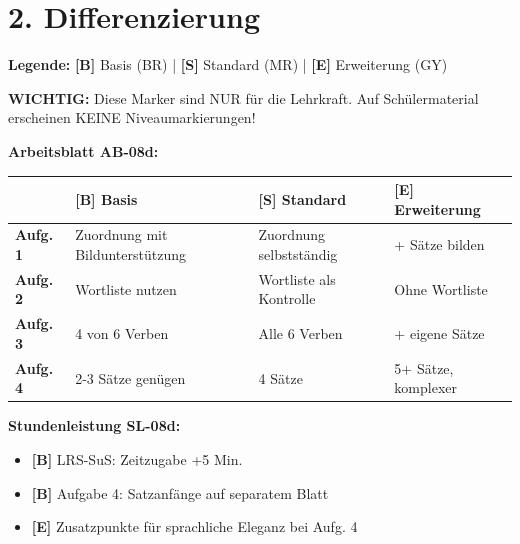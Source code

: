 \documentclass[11pt, a4paper]{article}
\newcommand{\B}{\textcolor{basis}{\textbf{[B]}}}
\newcommand{\Std}{\textcolor{standard}{\textbf{[S]}}}
\newcommand{\E}{\textcolor{erweiterung}{\textbf{[E]}}}
\begin{document}

\section*{2. Differenzierung}

\begin{differenzierung}
\textbf{Legende:} \B{} Basis (BR) | \Std{} Standard (MR) | \E{} Erweiterung (GY)

\vspace{0.5em}

\textbf{WICHTIG:} Diese Marker sind NUR für die Lehrkraft. Auf Schülermaterial erscheinen KEINE Niveaumarkierungen!
\end{differenzierung}

\vspace{1em}

\textbf{Arbeitsblatt AB-08d:}

\begin{tabularx}{\textwidth}{|l|X|X|X|}
\hline
& \B{} \textbf{Basis} & \Std{} \textbf{Standard} & \E{} \textbf{Erweiterung} \\
\hline
\textbf{Aufg. 1} & Zuordnung mit Bildunterstützung & Zuordnung selbstständig & + Sätze bilden \\
\hline
\textbf{Aufg. 2} & Wortliste nutzen & Wortliste als Kontrolle & Ohne Wortliste \\
\hline
\textbf{Aufg. 3} & 4 von 6 Verben & Alle 6 Verben & + eigene Sätze \\
\hline
\textbf{Aufg. 4} & 2-3 Sätze genügen & 4 Sätze & 5+ Sätze, komplexer \\
\hline
\end{tabularx}

\vspace{1em}

\textbf{Stundenleistung SL-08d:}

\begin{itemize}
    \item \B{} LRS-SuS: Zeitzugabe +5 Min.
    \item \B{} Aufgabe 4: Satzanfänge auf separatem Blatt
    \item \E{} Zusatzpunkte für sprachliche Eleganz bei Aufg. 4
\end{itemize}

\end{document}
